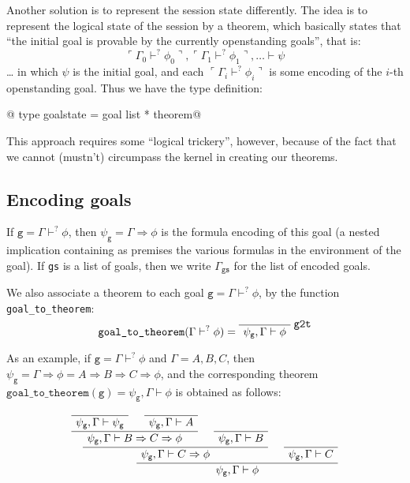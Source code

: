 \documentclass[a4paper,11pt]{article} %
\begin{document}
Another solution is to represent the session state differently. The idea is to represent the logical state of the session by a theorem, which basically states that “the initial goal is provable by the currently openstanding goals”, that is:
\begin{equation*}
\ulcorner \Gamma_0 \vdash^? \phi_0 \urcorner, \ulcorner \Gamma_1 \vdash^? \phi_1 \urcorner, … \vdash \psi
\end{equation*}
… in which $\psi$ is the initial goal, and each $\ulcorner \Gamma_i \vdash^? \phi_i \urcorner$ is some encoding of the $i$-th openstanding goal. Thus we have the type definition:

@  type goalstate = goal list * theorem@

This approach requires some “logical trickery”, however, because of the fact that we cannot (mustn't) circumpass the kernel in creating our theorems.

\subsection{Encoding goals}

If $\texttt{g} = \Gamma \vdash^? \phi$, then $\psi_\texttt{g} = \Gamma \Rightarrow \phi$ is the formula encoding of this goal (a nested implication containing as premises the various formulas in the environment of the goal). If \texttt{gs} is a list of goals, then we write $\Gamma_\texttt{gs}$ for the list of encoded goals.

We also associate a theorem to each goal $\texttt{g} = \Gamma \vdash^? \phi$, by the function \texttt{goal\_to\_theorem}:
\begin{equation*}
\texttt{goal\_to\_theorem}(\Gamma \vdash^? \phi) =
  \AxiomC{}
  \RightLabel{\texttt{g2t}}
  \UnaryInfC{$\psi_\texttt{g}, \Gamma \vdash \phi$}
  \bottomAlignProof
  \DisplayProof
\end{equation*}

As an example, if $\texttt{g} = \Gamma \vdash^? \phi$ and $\Gamma = A,B,C$, then $\psi_\texttt{g} = \Gamma \Rightarrow \phi = A \Rightarrow B \Rightarrow C \Rightarrow \phi$, and the corresponding theorem $\texttt{goal\_to\_theorem}(\texttt{g}) = \psi_\texttt{g}, \Gamma \vdash \phi$ is obtained as follows:

\begin{equation*}
\AxiomC{}
\UnaryInfC{$\psi_\texttt{g}, \Gamma \vdash \psi_\texttt{g}$}
\AxiomC{}
\UnaryInfC{$\psi_\texttt{g}, \Gamma \vdash A$}
\BinaryInfC{$\psi_\texttt{g}, \Gamma \vdash B \Rightarrow C \Rightarrow \phi$}
\AxiomC{}
\UnaryInfC{$\psi_\texttt{g}, \Gamma \vdash B$}
\BinaryInfC{$\psi_\texttt{g}, \Gamma \vdash C \Rightarrow \phi$}
\AxiomC{}
\UnaryInfC{$\psi_\texttt{g}, \Gamma \vdash C$}
\BinaryInfC{$\psi_\texttt{g}, \Gamma \vdash \phi$}
\DisplayProof
\end{equation*}
\end{document}
